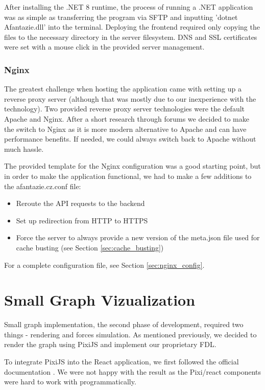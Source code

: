 After installing the .NET 8 runtime, the process of running a .NET application was as simple as transferring the program via SFTP
and inputting 'dotnet Afantazie.dll' into the terminal.
Deploying the frontend required only copying the files to the necessary directory in the server filesystem.
DNS and SSL certificates were set with a mouse click in the provided server management.

\subsubsection{Nginx}
The greatest challenge when hosting the application came with setting up a reverse proxy server (although that was mostly due to our inexperience with the technology).
Two provided reverse proxy server technologies were the default Apache and Nginx.
After a short research through forums we decided to make the switch to Nginx as it is more modern alternative to Apache and can have performance benefits.
If needed, we could always switch back to Apache without much hassle.

The provided template for the Nginx configuration was a good starting point, but in order to make the
application functional, we had to make a few additions to the afantazie.cz.conf file:
\begin{itemize}
    \item Reroute the API requests to the backend
    \item Set up redirection from HTTP to HTTPS
    \item Force the server to always provide a new version of the meta.json file used for cache busting (see Section \ref{sec:cache_busting})
\end{itemize}
For a complete configuration file, see Section \ref{sec:nginx_config}.

\section{Small Graph Vizualization}

\label{sec:small_graph_implementation}
Small graph implementation, the second phase of development, required two things - rendering and forces simulation.
As mentioned previously, we decided to render the graph using PixiJS and implement our proprietary \gls{FDL}.

To integrate PixiJS into the React application, we first followed the official documentation \cite{pixijs_official_react_guide}.
We were not happy with the result as the Pixi/react components were hard to work with programmatically.

